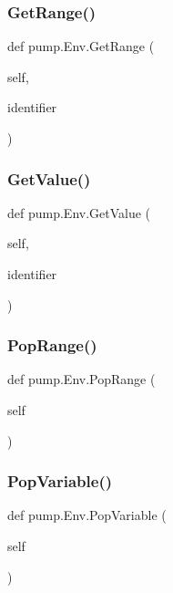 \mbox{\label{classpump_1_1_env_a1df05a550bdcfe4bb8c5b1608484a6dc}} 
\subsubsection{\texorpdfstring{GetRange()}{GetRange()}}
{\footnotesize\ttfamily def pump.\+Env.\+Get\+Range (\begin{DoxyParamCaption}\item[{}]{self,  }\item[{}]{identifier }\end{DoxyParamCaption})}

\mbox{\label{classpump_1_1_env_a43c3609179d5e458266731199e35313b}} 
\subsubsection{\texorpdfstring{GetValue()}{GetValue()}}
{\footnotesize\ttfamily def pump.\+Env.\+Get\+Value (\begin{DoxyParamCaption}\item[{}]{self,  }\item[{}]{identifier }\end{DoxyParamCaption})}

\mbox{\label{classpump_1_1_env_a45474355fc03b69e7449199cc8012ba9}} 
\subsubsection{\texorpdfstring{PopRange()}{PopRange()}}
{\footnotesize\ttfamily def pump.\+Env.\+Pop\+Range (\begin{DoxyParamCaption}\item[{}]{self }\end{DoxyParamCaption})}

\mbox{\label{classpump_1_1_env_abf35f8b971acedb275bb92bb29fcd587}} 
\subsubsection{\texorpdfstring{PopVariable()}{PopVariable()}}
{\footnotesize\ttfamily def pump.\+Env.\+Pop\+Variable (\begin{DoxyParamCaption}\item[{}]{self }\end{DoxyParamCaption})}

